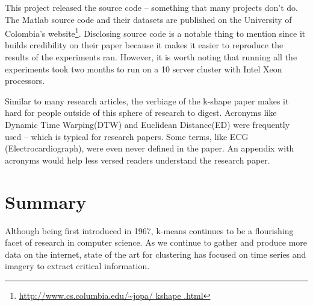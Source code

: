 \documentclass[12pt]{apa6}
\begin{document}
This project released the source code -- something that many projects don't do. The Matlab source code and their datasets are published on the University of Colombia's website\footnote{\url{http://www.cs.columbia.edu/~jopa/
kshape
.html}}. Disclosing source code is a notable thing to mention since it builds credibility on their paper because it makes it easier to reproduce the results of the experiments ran. However, it is worth noting that running all the experiments took two months to run on a 10 server cluster with Intel Xeon processors.

Similar to many research articles, the verbiage of the k-shape paper makes it hard for people outside of this sphere of research to digest. Acronyms like Dynamic Time Warping(DTW) and Euclidean Distance(ED) were frequently used -- which is typical for research papers. Some terms, like ECG (Electrocardiograph), were even never defined in the paper. An appendix with acronyms would help less versed readers understand the research paper.  



\section{Summary}


Although being first introduced in 1967, k-means continues to be a flourishing facet of research in computer science. As we continue to gather and produce more data on the internet, state of the art for clustering has focused on time series and imagery to extract critical information. 





\end{document}
